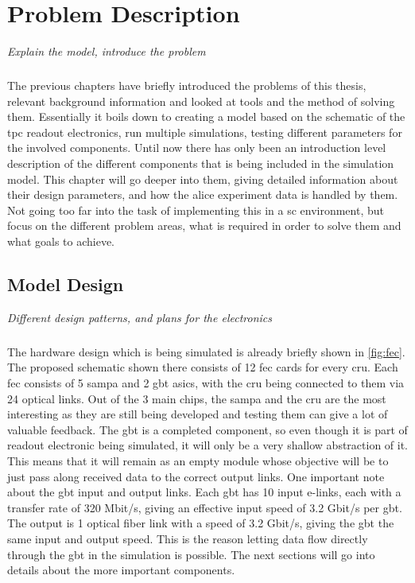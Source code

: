 \documentclass[a4paper, 12pt]{report}
\begin{document}
\chapter{Problem Description}
\textit{Explain the model, introduce the problem}
\label{cha:4}

\paragraph{}
The previous chapters have briefly introduced the problems of this thesis, relevant background information and looked at tools and the method of solving them.
Essentially it boils down to creating a model based on the schematic of the \gls{tpc} readout electronics, run multiple simulations, testing different parameters for the involved components.
Until now there has only been an introduction level description of the different components that is being included in the simulation model.
This chapter will go deeper into them, giving detailed information about their design parameters, and how the \gls{alice} experiment data is handled by them.
Not going too far into the task of implementing this in a \gls{sc} environment, but focus on the different problem areas, what is required in order to solve them and what goals to achieve.

\section{Model Design}
\textit{Different design patterns, and plans for the electronics}
\paragraph{}
The hardware design which is being simulated is already briefly shown in \ref{fig:fec}.
The proposed schematic shown there consists of 12 \gls{fec} cards for every \gls{cru}.
Each \gls{fec} consists of 5 \gls{sampa} and 2 \gls{gbt} \glspl{asic}, with the \gls{cru} being connected to them via 24 optical links.
Out of the 3 main chips, the \gls{sampa} and the \gls{cru} are the most interesting as they are still being developed and testing them can give a lot of valuable feedback.
The \gls{gbt} is a completed component, so even though it is part of readout electronic being simulated, it will only be a very shallow abstraction of it.
This means that it will remain as an empty module whose objective will be to just pass along received data to the correct output links.
One important note about the \gls{gbt} input and output links.
Each \gls{gbt} has 10 input e-links, each with a transfer rate of 320 Mbit/s, giving an effective input speed of 3.2 Gbit/s per \gls{gbt}.
The output is 1 optical fiber link with a speed of 3.2 Gbit/s, giving the \gls{gbt} the same input and output speed.
This is the reason letting data flow directly through the \gls{gbt} in the simulation is possible.
The next sections will go into details about the more important components.
\end{document}

